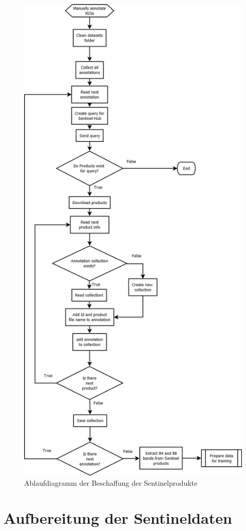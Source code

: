 \begin{figure}[ht]
  \centering
  \includegraphics[height=0.6\textheight, width=.6\textwidth]{pics/get-products.png}
  \caption{Ablaufdiagramm der Beschaffung der Sentinelprodukte}
  \label{fig:get-products}
\end{figure}

\section{Aufbereitung der Sentineldaten}

